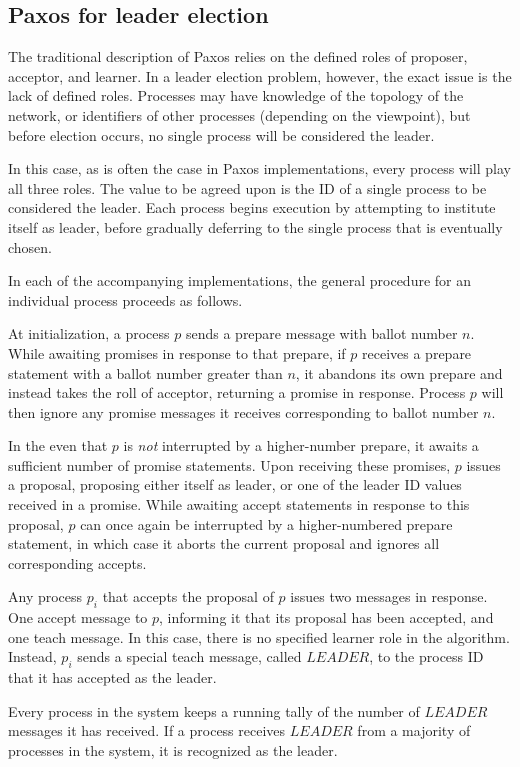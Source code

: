 \documentclass[12pt]{article}
\begin{document}
\subsection{Paxos for leader election}
The traditional description of Paxos relies on the defined roles of
proposer, acceptor, and learner. In a leader election problem,
however, the exact issue is the lack of defined roles. Processes
may have knowledge of the topology of the network, or identifiers
of other processes (depending on the viewpoint), but before
election occurs, no single process will be considered the leader.

In this case, as is often the case in Paxos implementations, every
process will play all three roles. The value to be agreed upon
is the ID of a single process to be considered the leader. Each
process begins execution by attempting to institute itself as leader,
before gradually deferring to the single process that is eventually chosen.

In each of the accompanying implementations, the general procedure for
an individual process proceeds as follows.

At initialization, a process $p$ sends a prepare message with ballot number $n$.
While awaiting promises in response to that prepare, if $p$ receives a prepare
statement with a ballot number greater than $n$, it abandons its own prepare and instead
takes the roll of acceptor, returning a promise in response. Process $p$ will
then ignore any promise messages it receives corresponding to ballot number $n$.

In the even that $p$ is \textit{not} interrupted by a higher-number prepare, it awaits
a sufficient number of promise statements. Upon receiving these promises, $p$ issues
a proposal, proposing either itself as leader, or one of the leader ID values received
in a promise. While awaiting accept statements in response to this proposal, $p$ can
once again be interrupted by a higher-numbered prepare statement, in which case it aborts
the current proposal and ignores all corresponding accepts.

Any process $p_i$ that accepts the proposal of $p$ issues two messages in response. One accept
message to $p$, informing it that its proposal has been accepted, and one teach message. In
this case, there is no specified learner role in the algorithm. Instead, $p_i$ sends a special teach
message, called $LEADER$, to the process ID that it has accepted as the leader.

Every process in the system keeps a running tally of the number of $LEADER$ messages it has received.
If a process receives $LEADER$ from a majority of processes in the system, it is recognized as the leader.
\end{document}
